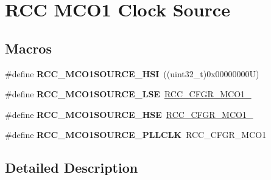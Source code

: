 \hypertarget{group___r_c_c___m_c_o1___clock___source}{}\section{R\+CC M\+C\+O1 Clock Source}
\label{group___r_c_c___m_c_o1___clock___source}
\subsection*{Macros}
\begin{DoxyCompactItemize}
\item 
\mbox{\label{group___r_c_c___m_c_o1___clock___source_gad99c388c455852143220397db3730635}} 
\#define {\bfseries R\+C\+C\+\_\+\+M\+C\+O1\+S\+O\+U\+R\+C\+E\+\_\+\+H\+SI}~((uint32\+\_\+t)0x00000000\+U)
\item 
\mbox{\label{group___r_c_c___m_c_o1___clock___source_gaa01b6cb196df3a4ad690f8bcaa4d0621}} 
\#define {\bfseries R\+C\+C\+\_\+\+M\+C\+O1\+S\+O\+U\+R\+C\+E\+\_\+\+L\+SE}~\mbox{\hyperlink{group___peripheral___registers___bits___definition_gafe73b3ad484eeecfa1556021677ecf4a}{R\+C\+C\+\_\+\+C\+F\+G\+R\+\_\+\+M\+C\+O1\+\_}}
\item 
\mbox{\label{group___r_c_c___m_c_o1___clock___source_ga5582d2ab152eb440a6cc3ae4833b043f}} 
\#define {\bfseries R\+C\+C\+\_\+\+M\+C\+O1\+S\+O\+U\+R\+C\+E\+\_\+\+H\+SE}~\mbox{\hyperlink{group___peripheral___registers___bits___definition_ga1c7e8d1da534f052ce835f06227a9b7a}{R\+C\+C\+\_\+\+C\+F\+G\+R\+\_\+\+M\+C\+O1\+\_}}
\item 
\mbox{\label{group___r_c_c___m_c_o1___clock___source_ga79d888f2238eaa4e4b8d02b3900ea18b}} 
\#define {\bfseries R\+C\+C\+\_\+\+M\+C\+O1\+S\+O\+U\+R\+C\+E\+\_\+\+P\+L\+L\+C\+LK}~R\+C\+C\+\_\+\+C\+F\+G\+R\+\_\+\+M\+C\+O1
\end{DoxyCompactItemize}


\subsection{Detailed Description}
